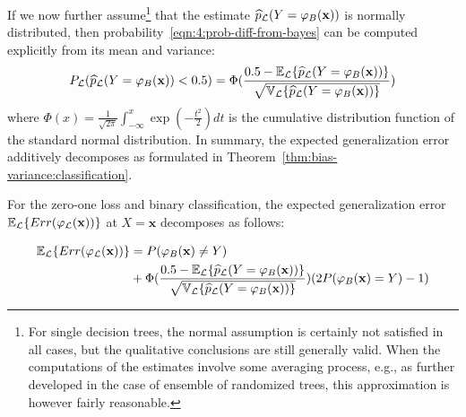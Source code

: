 If we now further assume\footnote{For single decision trees, the normal
assumption is certainly not satisfied in all cases, but the qualitative
conclusions are still generally valid. When the computations of the estimates
involve some averaging process, e.g., as further developed in the case of
ensemble of randomized trees, this approximation is however fairly reasonable.}
that the estimate $\widehat{p}_{\cal L}(Y=\varphi_B(\mathbf{x}))$ is normally distributed,
then probability~\ref{eqn:4:prob-diff-from-bayes} can be computed explicitly
from its mean and variance:
\begin{equation}
P_{\cal L}(\widehat{p}_{\cal L}(Y=\varphi_B(\mathbf{x})) < 0.5) = \Phi(\frac{0.5 - \mathbb{E}_{\cal L}\{ \widehat{p}_{\cal L}(Y=\varphi_B(\mathbf{x})) \}}{\sqrt{\mathbb{V}_{\cal L}\{ \widehat{p}_{\cal L}(Y=\varphi_B(\mathbf{x})) \}}})
\end{equation}
where $\Phi(x)=\frac{1}{\sqrt{2\pi}} \int_{-\infty}^x \exp(-\frac{t^2}{2}) dt$
is the cumulative distribution function of the standard normal distribution.
In summary, the expected generalization error additively
decomposes as formulated in Theorem~\ref{thm:bias-variance:classification}.

\begin{theorem}\label{thm:bias-variance:classification}
For the zero-one loss and binary classification, the expected
generalization error $\mathbb{E}_{\cal L} \{ Err(\varphi_{\cal L}(\mathbf{x}))
\}$ at $X=\mathbf{x}$ decomposes as follows:

\begin{align}
\mathbb{E}_{\cal L} \{ Err(\varphi_{\cal L}(\mathbf{x})) \} &= P(\varphi_B(\mathbf{x})\neq Y) \\
                                                            &+ \Phi(\frac{0.5 - \mathbb{E}_{\cal L}\{ \widehat{p}_{\cal L}(Y=\varphi_B(\mathbf{x})) \}}{\sqrt{\mathbb{V}_{\cal L}\{ \widehat{p}_{\cal L}(Y=\varphi_B(\mathbf{x})) \}}}) (2 P(\varphi_B(\mathbf{x}) = Y) - 1) \nonumber
\end{align}
\end{theorem}

